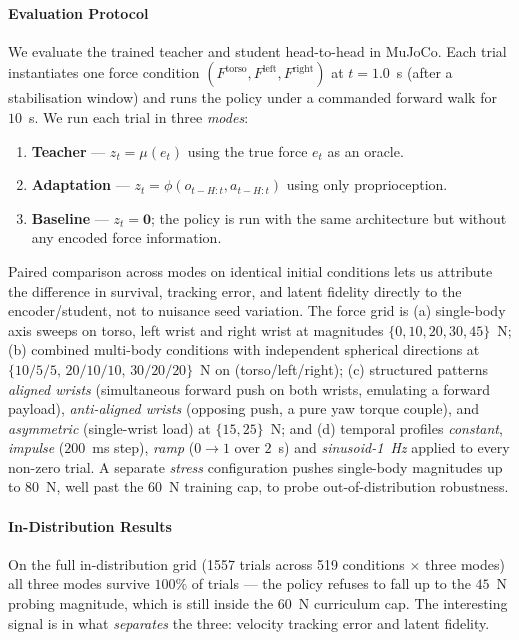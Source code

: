\paragraph{Evaluation Protocol}
\label{sec:rma_eval}
We evaluate the trained teacher and student head-to-head in MuJoCo. Each
trial instantiates one force condition $(F^{\text{torso}},
F^{\text{left}}, F^{\text{right}})$ at $t\!=\!1.0$~s (after a stabilisation
window) and runs the policy under a commanded forward walk for $10$~s.
We run each trial in three \emph{modes}:
\begin{enumerate}
    \item \textbf{Teacher} --- $z_t = \mu(e_t)$ using the true force $e_t$
          as an oracle.
    \item \textbf{Adaptation} --- $z_t = \phi(o_{t-H:t}, a_{t-H:t})$ using
          only proprioception.
    \item \textbf{Baseline} --- $z_t = \mathbf{0}$; the policy is run with
          the same architecture but without any encoded force information.
\end{enumerate}
Paired comparison across modes on identical initial conditions lets us
attribute the difference in survival, tracking error, and latent fidelity
directly to the encoder/student, not to nuisance seed variation. The
force grid is (a) single-body axis sweeps on torso, left wrist and right
wrist at magnitudes $\{0, 10, 20, 30, 45\}$~N; (b) combined multi-body
conditions with independent spherical directions at
$\{10/5/5,\,20/10/10,\,30/20/20\}$~N on (torso/left/right); (c) structured
patterns \emph{aligned wrists} (simultaneous forward push on both wrists,
emulating a forward payload), \emph{anti-aligned wrists} (opposing push,
a pure yaw torque couple), and \emph{asymmetric} (single-wrist load) at
$\{15,25\}$~N; and (d) temporal profiles \emph{constant}, \emph{impulse}
($200$~ms step), \emph{ramp} ($0\!\to\!1$ over $2$~s) and
\emph{sinusoid-1~Hz} applied to every non-zero trial. A separate
\emph{stress} configuration pushes single-body magnitudes up to $80$~N,
well past the $60$~N training cap, to probe out-of-distribution
robustness.

\paragraph{In-Distribution Results}
\label{sec:rma_results_id}
On the full in-distribution grid (1557 trials across 519 conditions $\times$
three modes) all three modes survive $100\%$ of trials --- the policy
refuses to fall up to the $45$~N probing magnitude, which is still inside
the $60$~N curriculum cap. The interesting signal is in what
\emph{separates} the three: velocity tracking error and latent fidelity.

